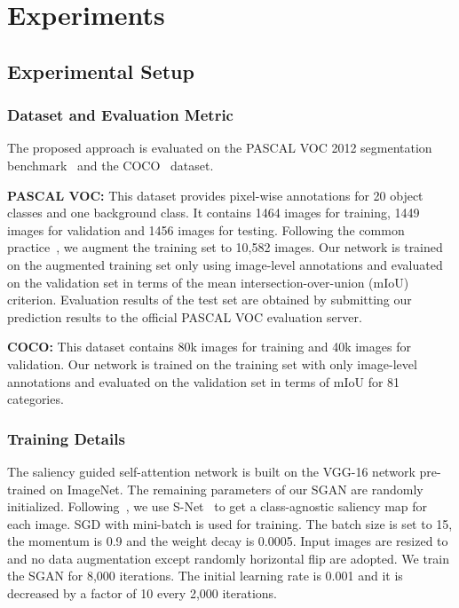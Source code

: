 \documentclass[journal]{IEEEtran}
\begin{document}
\section{Experiments}
\subsection{Experimental Setup}

\subsubsection{Dataset and Evaluation Metric} The proposed approach is evaluated on the PASCAL VOC 2012 segmentation benchmark~\cite{everingham2010pascal} and the COCO~\cite{lin2014microsoft} dataset. 


\textbf{PASCAL VOC:} This dataset provides pixel-wise annotations for 20 object classes and one background class. It contains 1464 images for training, 1449 images for validation and 1456 images for testing. Following the common practice~\cite{kolesnikov2016seed,huang2018weakly,wei2018revisiting}, we augment the training set to 10,582 images. Our network is trained on the augmented training set only using image-level annotations and evaluated on the validation set in terms of the mean intersection-over-union (mIoU) criterion. Evaluation results of the test set are obtained by submitting our prediction results to the official PASCAL VOC evaluation server. 

\textbf{COCO:} This dataset contains 80k images for training and 40k images for validation. Our network is trained on the training set with only image-level annotations and evaluated on the validation set in terms of mIoU for 81 categories.

\subsubsection{Training Details}
The saliency guided self-attention network is built on the VGG-16 network pre-trained on ImageNet. The remaining parameters of our SGAN are randomly initialized. Following~\cite{wei2018revisiting}, we use S-Net~\cite{xiao2018deep} to get a class-agnostic saliency map for each image. SGD with mini-batch is used for training. The batch size is set to 15, the momentum is 0.9 and the weight decay is 0.0005. Input images are resized to  and no data augmentation except randomly horizontal flip are adopted. We train the SGAN for 8,000 iterations. The initial learning rate is 0.001 and it is decreased by a factor of 10 every 2,000 iterations.
\end{document}

